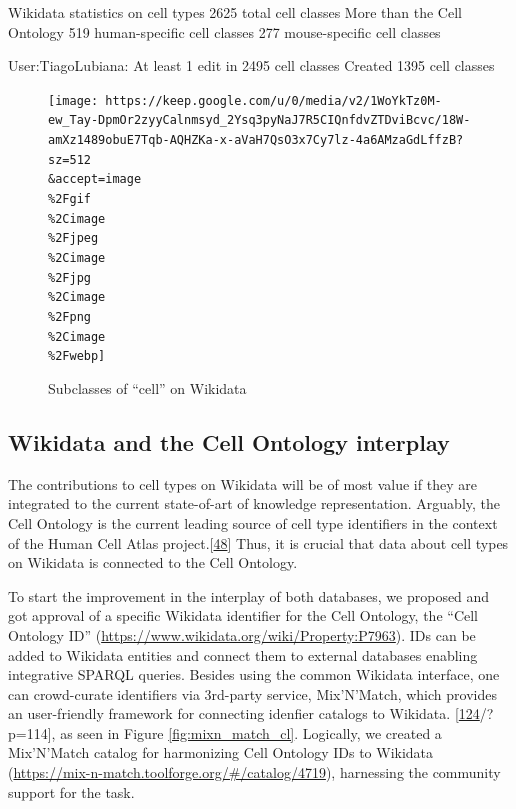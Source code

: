 Wikidata statistics on cell types
2625 total cell classes
More than the Cell Ontology
519 human-specific cell classes
277 mouse-specific cell classes

User:TiagoLubiana:
At least 1 edit in 2495 cell classes
Created 1395 cell classes

\begin{figure}
\hypertarget{fig:subclass_of_cell}{%
\centering
\texttt{[image: https://keep.google.com/u/0/media/v2/1WoYkTz0M-ew\_Tay-DpmOr2zyyCalnmsyd\_2Ysq3pyNaJ7R5CIQnfdvZTDviBcvc/18W-amXz1489obuE7Tqb-AQHZKa-x-aVaH7QsO3x7Cy7lz-4a6AMzaGdLffzB?sz=512\\\&accept=image\\\%2Fgif\\\%2Cimage\\\%2Fjpeg\\\%2Cimage\\\%2Fjpg\\\%2Cimage\\\%2Fpng\\\%2Cimage\\\%2Fwebp]}
\caption{Subclasses of ``cell'' on Wikidata}\label{fig:subclass_of_cell}
}
\end{figure}

\hypertarget{wikidata-and-the-cell-ontology-interplay}{%
\subsection{Wikidata and the Cell Ontology interplay}\label{wikidata-and-the-cell-ontology-interplay}}

The contributions to cell types on Wikidata will be of most value if they are integrated to the current state-of-art of knowledge representation.
Arguably, the Cell Ontology is the current leading source of cell type identifiers in the context of the Human Cell Atlas project.{[}\protect\hyperlink{ref-qT8WxqjA}{48}{]}
Thus, it is crucial that data about cell types on Wikidata is connected to the Cell Ontology.

To start the improvement in the interplay of both databases, we proposed and got approval of a specific Wikidata identifier for the Cell Ontology, the ``Cell Ontology ID'' (\url{https://www.wikidata.org/wiki/Property:P7963}).
IDs can be added to Wikidata entities and connect them to external databases enabling integrative SPARQL queries.
Besides using the common Wikidata interface, one can crowd-curate identifiers via 3rd-party service, Mix'N'Match, which provides an user-friendly framework for connecting idenfier catalogs to Wikidata. {[}\protect\hyperlink{ref-JgiKEEdq}{124}/?p=114{]}, as seen in Figure \ref{fig:mixn_match_cl}.
Logically, we created a Mix'N'Match catalog for harmonizing Cell Ontology IDs to Wikidata (\url{https://mix-n-match.toolforge.org/\#/catalog/4719}), harnessing the community support for the task.

